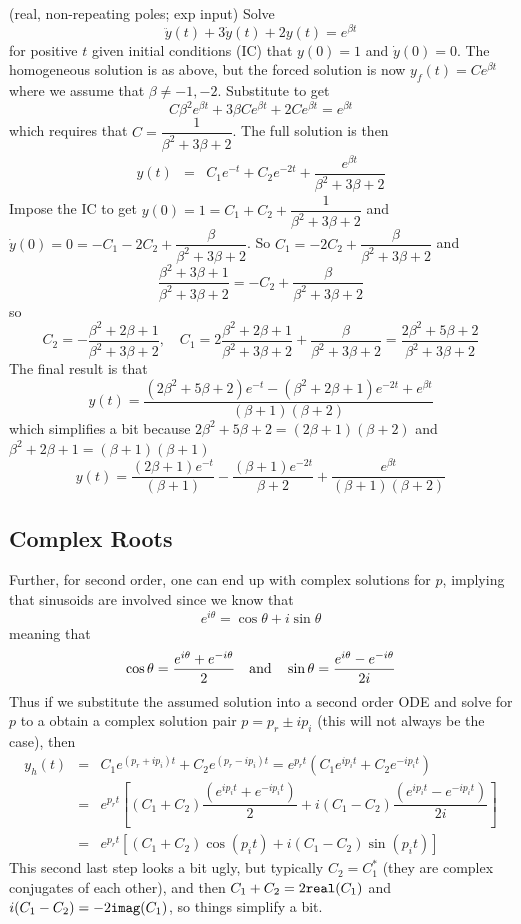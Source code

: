 \documentclass[12pt]{article}
\begin{document}
\begin{example} (real, non-repeating poles; exp input) 
Solve $$\ddot y(t) + 3 \dot y(t) + 2 y(t) = e^{\beta t}$$ 
for positive $t$ given initial conditions (IC) that $y(0)=1$ and $\dot y(0) = 0$. The homogeneous solution is as above, but the forced solution is now $y_f(t)= C e^{\beta t}$ where we assume that $\beta \neq -1,-2$. Substitute to get
$$
C \beta^2 e^{\beta t} +3 \beta Ce^{\beta t} + 2Ce^{\beta t} = e^{\beta t}
$$
which requires that $C=\dfrac{1}{\beta^2 + 3 \beta + 2 }$.
The full solution is then
\begin{eqnarray}
y(t) &=& C_1 e^{-t} + C_2 e^{-2t} + \dfrac{e^{\beta t}}{\beta^2 + 3 \beta + 2 }
\end{eqnarray}
Impose the IC to get $y(0)=1 = C_1+C_2 + \dfrac{1}{\beta^2 + 3 \beta + 2 }$ 
and $\dot y(0)= 0 = -C_1-2C_2 + \dfrac{\beta}{\beta^2 + 3 \beta + 2 }$. 
So $C_1=-2C_2 + \dfrac{\beta}{\beta^2 + 3 \beta + 2 }$ and
$$
\dfrac{\beta^2 + 3\beta +1}{\beta^2 + 3 \beta + 2 } = -C_2 + \dfrac{\beta}{\beta^2 + 3 \beta + 2 }
$$
so
$$
C_2 = -\dfrac{\beta^2 + 2\beta +1}{\beta^2 + 3 \beta + 2 }, \quad C_1 = 2 \dfrac{\beta^2 + 2\beta +1}{\beta^2 + 3 \beta + 2 } + \dfrac{\beta}{\beta^2 + 3 \beta + 2 } = \dfrac{2\beta^2 +5\beta +2}{\beta^2 + 3 \beta + 2 }
$$
The final result is that
$$
y(t) =  \dfrac{(2\beta^2 + 5 \beta +2)e^{-t}  -    (\beta^2 + 2\beta +1)e^{-2t}  + e^{\beta t}}{(\beta + 1)(\beta + 2)}
$$
which simplifies a bit because $2\beta^2 + 5 \beta +2 = (2\beta + 1)(\beta + 2)$ and  $\beta^2 + 2\beta + 1 = (\beta + 1)(\beta + 1)$
$$
y(t) =  \dfrac{(2\beta +1)e^{-t}}{(\beta + 1)}
-\dfrac{(\beta +1)e^{-2t}  }{\beta + 2}
+ \dfrac{e^{\beta t}}{(\beta + 1)(\beta + 2)}
$$
\end{example}

\subsection{Complex Roots} Further, for second order, one can end up with complex solutions for $p$, implying that sinusoids are involved since we know that $$e^{i\theta} = \cos \theta + i \sin \theta$$ meaning that
$$
\cos \theta = \dfrac{e^{i \theta} + e^{-i \theta}}{2} \quad {\rm and} \quad
\sin \theta = \dfrac{e^{i \theta} - e^{-i \theta}}{2i}
$$ 
Thus if we substitute the assumed solution into a second order ODE and solve for $p$ to a obtain a complex solution pair $p=p_r\pm i p_i$ (this will not always be the case), then
\begin{eqnarray}
y_h(t) &=& C_1 e^{(p_r + i p_i)t} + C_2 e^{(p_r - i p_i)t} = e^{p_r t} ( C_1 e^{i p_i t} + C_2 e^{- i p_i t}) \\ 
&=&  e^{p_r t}\left[ \left(C_1+C_2\right) \dfrac{(e^{i p_i t} + e^{- i p_i t})}{2}  +i\left(C_1-C_2\right) \dfrac{(e^{i p_i t} - e^{- i p_i t})}{2i}\right] \\
&=&  e^{p_r t}\left[ \left(C_1+C_2\right) \cos(p_i t) +  i\left(C_1-C_2\right) \sin(p_i t) \right]
\end{eqnarray}
This second last step looks a bit ugly, but typically $C_2=C_1^*$ (they are complex conjugates of each other), and then $C_1+C_2 = 2{\tt real}(C_1)$ and $i(C_1-C_2) = -2{\tt imag}(C_1)$, so things simplify a bit.
\end{document}
